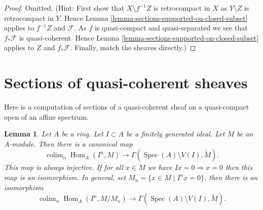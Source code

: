 \documentclass{stacks-project}
\theoremstyle{plain}
\newtheorem{lemma}[subsection]{Lemma}
\theoremstyle{definition}
\theoremstyle{remark}
\numberwithin{equation}{subsection}
\def\colim{\mathop{\mathrm{colim}}\nolimits}
\def\Spec{\mathop{\mathrm{Spec}}}
\def\Hom{\mathop{\mathrm{Hom}}\nolimits}
\begin{document}
\begin{proof}
Omitted. (Hint: First show that $X \setminus f^{-1}Z$ is retrocompact
in $X$ as $Y \setminus Z$ is retrocompact in $Y$. Hence
Lemma \ref{lemma-sections-supported-on-closed-subset}
applies to $f^{-1}Z$ and $\mathcal{F}$. As $f$ is quasi-compact and
quasi-separated we see that $f_*\mathcal{F}$ is quasi-coherent.
Hence Lemma \ref{lemma-sections-supported-on-closed-subset}
applies to $Z$ and $f_*\mathcal{F}$. Finally, match the sheaves
directly.)
\end{proof}








\section{Sections of quasi-coherent sheaves}
\label{section-sections-quasi-coherent}

\noindent
Here is a computation of sections of a quasi-coherent sheaf on a quasi-compact
open of an affine spectrum.

\begin{lemma}
\label{lemma-sections-over-quasi-compact-open-in-affine}
Let $A$ be a ring.
Let $I \subset A$ be a finitely generated ideal.
Let $M$ be an $A$-module.
Then there is a canonical map
$$
\colim_n \Hom_A(I^n, M)
\longrightarrow
\Gamma(\Spec(A) \setminus V(I), \widetilde{M}).
$$
This map is always injective.
If for all $x \in M$ we have $Ix = 0 \Rightarrow x = 0$
then this map is an isomorphism. In general, set
$M_n = \{x \in M \mid I^nx = 0\}$, then there is an
isomorphism
$$
\colim_n \Hom_A(I^n, M/M_n)
\longrightarrow
\Gamma(\Spec(A) \setminus V(I), \widetilde{M}).
$$
\end{lemma}
\end{document}

